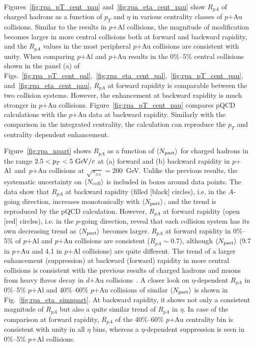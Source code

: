 \documentclass[twocolumn,letterpaper,aps,prc,longbibliography,superscriptaddress,nofootinbib,floatfix]{revtex4-2}
\newcommand{\pt}{\mbox{$p_T$}\xspace}
\newcommand{\rpa}{\mbox{$R_{pA}$}\xspace}
\newcommand{\npart}{\mbox{$\langle N_{\rm part} \rangle$}\xspace}
\newcommand{\ncoll}{\mbox{$\langle N_{\rm coll} \rangle$}\xspace}
\newcommand{\sqsntwo}{\mbox{$\sqrt{s_{_{NN}}}=200$~GeV}\xspace}
\newcommand{\dau}{\mbox{$d$$+$Au}\xspace}
\newcommand{\pau}{\mbox{$p$$+$Au}\xspace}
\newcommand{\pal}{\mbox{$p$$+$Al}\xspace}
\newcommand{\palau}{\mbox{$p$$+$Al and $p$$+$Au}\xspace}
\begin{document}
Figures~\ref{fig:rpa_pT_cent_pau} and~\ref{fig:rpa_eta_cent_pau} show 
\rpa of charged hadrons as a function of \pt and $\eta$ in various 
centrality classes of \pau collisions. Similar to the results in \pal 
collisions, the magnitude of modification becomes larger in more central 
collisions both at forward and backward rapidity, and the \rpa values in 
the most peripheral \pau collisions are consistent with unity. When 
comparing \pal and \pau results in the 0\%--5\% central collisions shown 
in the panel (a) of 
Figs.~\ref{fig:rpa_pT_cent_pal},~\ref{fig:rpa_eta_cent_pal},~\ref{fig:rpa_pT_cent_pau}, 
and~\ref{fig:rpa_eta_cent_pau}, \rpa at forward rapidity is comparable 
between the two collision systems. However, the enhancement at backward 
rapidity is much stronger in \pau collisions.  
Figure~\ref{fig:rpa_pT_cent_pau} compares pQCD calculations with the 
\pau data at backward rapidity. Similarly with the comparison in the 
integrated centrality, the calculation can reproduce the \pt and 
centrality dependent enhancement.

Figure~\ref{fig:rpa_npart} shows \rpa as a function of \npart for 
charged hadrons in the range $2.5<\pt<5~{\rm GeV}/c$ at (a) forward and 
(b) backward rapidity in \palau collisions at \sqsntwo. Unlike the 
previous results, the systematic uncertainty on \ncoll is included in 
boxes around data points. The data show that \rpa at backward rapidity 
(filled [black] circles), i.e. in the $A$-going direction, increases 
monotonically with \npart, and the trend is reproduced by the pQCD 
calculation. However, \rpa at forward rapidity (open [red] circles), 
i.e. in the $p$-going direction, reveal that each collision system has 
its own decreasing trend as \npart becomes larger. \rpa at forward 
rapidity in 0\%--5\% of \pal and \pau collisions are consistent 
($\rpa\sim0.7$), although $\npart$ (9.7 in \pau and 4.1 in \pal 
collisions) are quite different. The trend of a larger enhancement 
(suppression) at backward (forward) rapidity in more central collisions 
is consistent with the previous results of charged hadrons and muons 
from heavy flavor decay in \dau 
collisions~\cite{Adler:2004eh,Adare:2013lkk}. A closer look on 
$\eta$-dependent \rpa in 0\%--5\% \pal and 40\%--60\% \pau collisions of 
similar \npart is shown in Fig.~\ref{fig:rpa_eta_simnpart}. At backward 
rapidity, it shows not only a consistent magnitude of \rpa but also a 
quite similar trend of \rpa in $\eta$. In case of the comparison at 
forward rapidity, \rpa of the 40\%--60\% \pau centrality bin is 
consistent with unity in all $\eta$ bins, whereas a $\eta$-dependent 
suppression is seen in 0\%--5\% \pal collisions.
\end{document}
